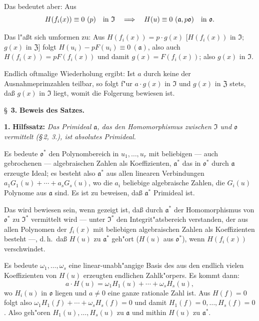 Das bedeutet aber: Aus \[
H(f_i(x))\equiv0\ (p)\quad\hbox{in }\mathfrak{I}
\quad\Longrightarrow\quad
H(u)\equiv0\ (\mathfrak{a},p\mathfrak{o})\quad\hbox{in }\mathfrak{o}.
\]

Das l"a\ss t sich umformen zu: Aus $H(f_i(x)) = p \cdot g(x)$ [$H(f_i(x))$ in $\mathfrak{I}$; $g(x)$ in $\mathfrak{Z}$] folgt $H(u_i)-pF(u_i)\equiv0\ (\mathfrak{a})$, also auch $H(f_i(x)) = pF(f_i(x))$ und damit $g(x) = F(f_i(x))$; also $g(x)$ in $\mathfrak{I}$.

Endlich oftmalige Wiederholung ergibt: Ist $a$ durch keine der Ausnahmeprimzahlen teilbar, so folgt f"ur $a \cdot g(x)$ in $\mathfrak{I}$ und $g(x)$ in $\mathfrak{Z}$ stets, da\ss{} $g(x)$ in $\mathfrak{I}$ liegt, womit die Folgerung bewiesen ist.

\bigskip
\S~\textbf{3.}
\textbf{Beweis des Satzes.}

\smallskip

\noindent\textbf{1.} \textbf{Hilfssatz:}
\textit{Das Primideal $\mathfrak{a}$, das den Homomorphismus zwischen $\mathfrak{I}$ und $\mathfrak{o}$ vermittelt (\S\,2, 3.), ist absolutes Primideal.}

Es bedeute $\mathfrak{o}^*$ den Polynombereich in $u_1,\ldots,u_r$ mit beliebigen --- auch gebrochenen --- algebraischen Zahlen als Koeffizienten, $\mathfrak{a}^*$ das in $\mathfrak{o}^*$ durch $\mathfrak{a}$ erzeugte Ideal; es besteht also $\mathfrak{a}^*$ aus allen linearen Verbindungen $a_1 G_1(u) + \cdots + a_s G_s(u)$, wo die $a_i$ beliebige algebraische Zahlen, die $G_i(u)$ Polynome aus $\mathfrak{a}$ sind. Es ist zu beweisen, da\ss{} $\mathfrak{a}^*$ Primideal ist.

Das wird bewiesen sein, wenn gezeigt ist, da\ss{} durch $\mathfrak{a}^*$ der Homomorphismus von $\mathfrak{o}^*$ zu $\mathfrak{I}^*$ vermittelt wird --- unter $\mathfrak{I}^*$ den Integrit"atsbereich verstanden, der aus allen Polynomen der $f_i(x)$ mit beliebigen algebraischen Zahlen als Koeffizienten besteht ---, d.\,h.\ da\ss{} $H(u)$ zu $\mathfrak{a}^*$ geh"ort ($H(u)$ aus $\mathfrak{o}^*$), wenn $H(f_i(x))$ verschwindet.

Es bedeute $\omega_1,\ldots,\omega_s$ eine linear-unabh"angige Basis des aus den endlich vielen Koeffizienten von $H(u)$ erzeugten endlichen Zahlk"orpers. Es kommt dann:
\[
a \cdot H(u) = \omega_1 H_1(u) + \cdots + \omega_s H_s(u),
\]
wo $H_i(u)$ in $\mathfrak{o}$ liegen und $a \neq 0$ eine ganze rationale Zahl ist. Aus $H(f) = 0$ folgt also $\omega_1 H_1(f) + \cdots + \omega_s H_s(f) = 0$ und damit $H_1(f) = 0,\ldots, H_s(f) = 0$. Also geh"oren $H_1(u),\ldots,H_s(u)$ zu $\mathfrak{a}$ und mithin $H(u)$ zu $\mathfrak{a}^*$.

